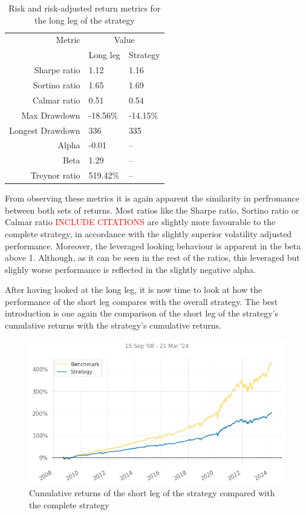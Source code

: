 \begin{table}[ht]
    \centering
    \begin{tabular}{rll}
        \toprule
        Metric & \multicolumn{2}{c}{Value} \\ 
        \cmidrule(lr){2-3}
            & Long leg & Strategy \\
        \midrule
        Sharpe ratio & 1.12 & 1.16 \\
        Sortino ratio & 1.65 & 1.69 \\
        Calmar ratio & 0.51 & 0.54 \\
        Max Drawdown & -18.56\% & -14.15\% \\
        Longest Drawdown & 336 & 335 \\
        Alpha & -0.01 & -- \\
        Beta & 1.29 & -- \\
        Treynor ratio & 519.42\% & -- \\
        \bottomrule
    \end{tabular}
    \caption{Risk and risk-adjusted return metrics for the long leg of the strategy}
    \label{table:risk-adjusted-long-vs-strat}
\end{table}

From observing these metrics it is again apparent the similarity in perfromance between both sets of returns. Most ratios like the Sharpe ratio, Sortino ratio or Calmar ratio \textcolor{red}{INCLUDE CITATIONS} are slightly more favourable to the complete strategy, in accordance with the slightly superior volatility adjusted performance. Moreover, the leveraged looking behaviour is apparent in the beta above 1. Although, as it can be seen in the rest of the ratios, this leveraged but slighly worse performance is reflected in the slightly negative alpha. 


After having looked at the long leg, it is now time to look at how the performance of the short leg compares with the overall strategy. The best introduction is one again the comparison of the short leg of the strategy's cumulative returns with the strategy's cumulative returns.

\begin{figure}[ht]
    \includegraphics[width=\linewidth]{assets/short-vs-strat.png}
    \caption{Cumulative returns of the short leg of the strategy compared with the complete strategy}
    \label{fig:short-vs-strat}
\end{figure}

